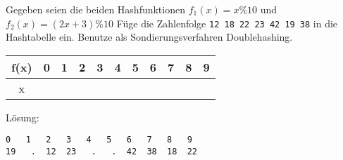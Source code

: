 
\renewcommand{\arraystretch}{2.0}
\setlength{\tabcolsep}{14pt}
\question[4]
Gegeben seien die beiden Hashfunktionen $f_1(x) = x \% 10$ und $f_2(x) = (2x+3) \% 10$
Füge die Zahlenfolge
\texttt{12 18 22 23 42 19 38}  in die Hashtabelle ein.
Benutze als Sondierungsverfahren Doublehashing.

\begin{tabular}{|c|c|c|c|c|c|c|c|c|c|c|}
\hline f(x) & 0 & 1 & 2 & 3 & 4 & 5 & 6 & 7 & 8 & 9 \\
\hline x     &   &    &    &   &   &    &    &   &   & \\
\hline
\end{tabular}

\ifprintanswers
Lösung:
\begin{lstlisting}
0   1   2   3   4   5   6   7   8   9
19   .  12  23   .   .  42  38  18  22
\end{lstlisting}
\fi
